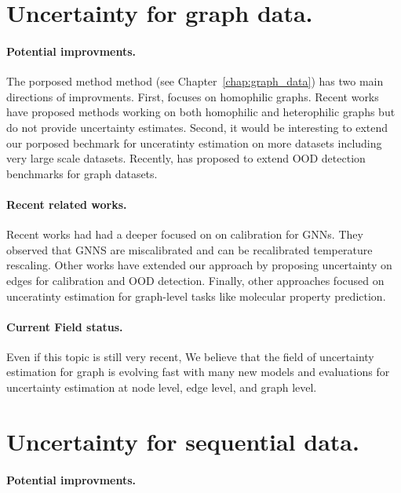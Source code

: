 \section{Uncertainty for graph data.}

\paragraph{Potential improvments.} The porposed method \GPNacro{} method (see Chapter~\ref{chap:graph_data}) has two main directions of improvments. First, \GPNacro{} focuses on homophilic graphs. Recent works have proposed methods \cite{bodnar2022sheaf, giovanni2022graff} working on both homophilic and heterophilic graphs but do not provide uncertainty estimates. Second, it would be interesting to extend our porposed bechmark for unceratinty estimation on more datasets including very large scale datasets. Recently, \cite{gui2022good} has proposed to extend OOD detection benchmarks for graph datasets.


\paragraph{Recent related works.} Recent works \cite{texeira2019GNNmiscalibrated, hsu2022GNNmiscalibrated, wang2021confident} had had a deeper focused on on calibration for GNNs. They observed that GNNS are miscalibrated and can be recalibrated temperature rescaling. Other works \cite{zhou2022OODlink, hsu2022structure} have extended our approach by proposing uncertainty on edges for calibration and OOD detection. Finally, other approaches \cite{soleimany2021evidential} focused on unceratinty estimation for graph-level tasks like molecular property prediction.

\paragraph{Current Field status.} Even if this topic is still very recent, We believe that the field of uncertainty estimation for graph is evolving fast with many new models and evaluations for uncertainty estimation at node level, edge level, and graph level. 

\section{Uncertainty for sequential data.}

\paragraph{Potential improvments.}

